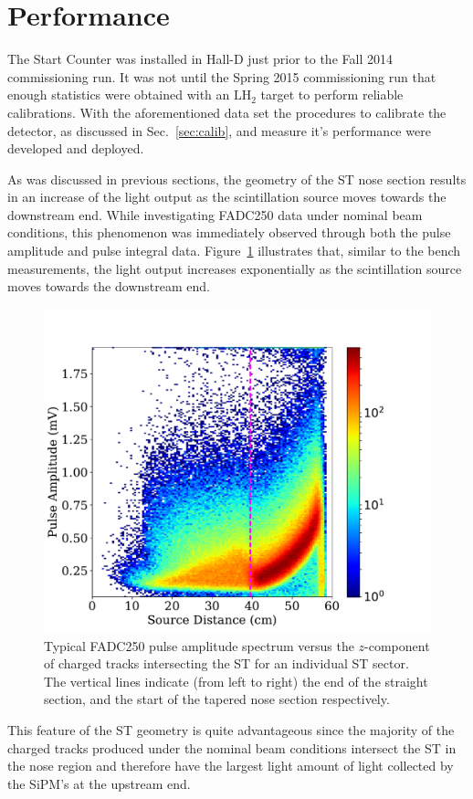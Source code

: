 \section{Performance} \label{sec:perform}

The Start Counter was installed in Hall-D just prior to the Fall 2014 \gx{} commissioning run.  It was not until the Spring 2015 commissioning run that enough statistics were obtained with an $\mathrm{LH_{2}}$ target to perform reliable calibrations.  With the aforementioned data set the procedures to calibrate the detector, as discussed in Sec.~\ref{sec:calib}, and measure it's performance were developed and deployed.

As was discussed in previous sections, the geometry of the ST nose section results in an increase of the light output as the scintillation source moves towards the downstream end.  While investigating FADC250 data under nominal beam conditions, this phenomenon was immediately observed through both the pulse amplitude and pulse integral data. Figure~\ref{fig:pippvszint} illustrates that, similar to the bench measurements, the light output increases exponentially as the scintillation source moves towards the downstream end.
	\begin{figure}[!htb]
		\centering
		\includegraphics[width=1.0\columnwidth]{performance/figs/PPZ}
		\caption{Typical FADC250 pulse amplitude spectrum versus the $z$-component of charged tracks intersecting the ST for an individual ST sector. The vertical lines  indicate (from left to right) the end of the straight section, and the start of the tapered nose section respectively.}
		\label{fig:pippvszint}
	\end{figure}
This feature of the ST geometry is quite advantageous since the majority of the charged tracks produced under the nominal \gx{} beam conditions intersect the ST in the nose region and therefore have the largest light amount of light collected by the SiPM's at the upstream end.

